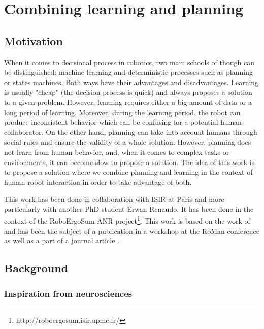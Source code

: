 \documentclass[english,a4paper,11pt,twoside]{StyleThese}
\begin{document}
\setcounter{chapter}{6} %
\dominitoc
\faketableofcontents
\fi

\chapter{Combining learning and planning}
\minitoc

\label{ch:Learning}

\section{Motivation}

When it comes to decisional process in robotics, two main schools of though can be distinguished: machine learning and deterministic processes such as planning or states machines. Both ways have their advantages and disadvantages. Learning is usually "cheap" (the decision process is quick) and always proposes a solution to a given problem. However, learning requires either a big amount of data or a long period of learning. Moreover, during the learning period, the robot can produce inconsistent behavior which can be confusing for a potential human collaborator. On the other hand, planning can take into account humans through social rules and ensure the validity of a whole solution. However, planning does not learn from human behavior, and, when it comes to complex tasks or environments, it can become slow to propose a solution. The idea of this work is to propose a solution where we combine planning and learning in the context of human-robot interaction in order to take advantage of both. 

This work has been done in collaboration with ISIR at Paris and more particularly with another PhD student Erwan Renaudo. It has been done in the context of the RoboErgoSum ANR project\footnote{http://roboergosum.isir.upmc.fr/}. This work is based on the work of \cite{renaudo2014design} and has been the subject of a publication in a workshop at the RoMan conference \cite{renaudo2015learning} as well as a part of a journal article \cite{khamassi2016integration}.

\section{Background}

\subsection{Inspiration from neurosciences}
\end{document}
